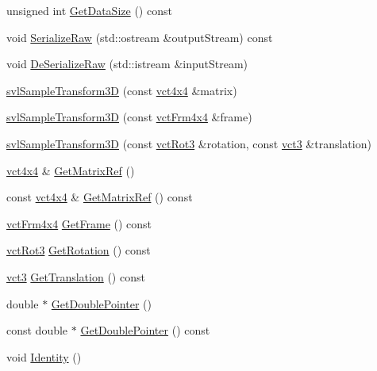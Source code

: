 \begin{DoxyCompactItemize}
\item 
unsigned int \hyperlink{classsvl_sample_transform3_d_aa7ba079194c5099ecc01fb9b8c0ba997}{Get\-Data\-Size} () const 
\item 
void \hyperlink{classsvl_sample_transform3_d_ad35557a72d1137681b37ba5b13686a9e}{Serialize\-Raw} (std\-::ostream \&output\-Stream) const 
\item 
void \hyperlink{classsvl_sample_transform3_d_a31daf08c5c80e9178b230f9f73678343}{De\-Serialize\-Raw} (std\-::istream \&input\-Stream)
\item 
\hyperlink{classsvl_sample_transform3_d_aeb4b9ed91b37d494bcd08fa9c7b37a89}{svl\-Sample\-Transform3\-D} (const \hyperlink{vct_fixed_size_matrix_types_8h_abd214ec98373cc3197c87dfd916c673f}{vct4x4} \&matrix)
\item 
\hyperlink{classsvl_sample_transform3_d_a6e82e35319a6cdb8c0cedeacd29237b9}{svl\-Sample\-Transform3\-D} (const \hyperlink{vct_transformation_types_8h_a33da47f4deb2556b37a69a2c44b29d75}{vct\-Frm4x4} \&frame)
\item 
\hyperlink{classsvl_sample_transform3_d_ae3e0b2b21ffd30f605ec9d70217095c0}{svl\-Sample\-Transform3\-D} (const \hyperlink{vct_transformation_types_8h_a248e13aafc9f88d238f1b29fa3f65536}{vct\-Rot3} \&rotation, const \hyperlink{vct_fixed_size_vector_types_8h_a3af82acdbf4eeb73c551909240b106ea}{vct3} \&translation)
\item 
\hyperlink{vct_fixed_size_matrix_types_8h_abd214ec98373cc3197c87dfd916c673f}{vct4x4} \& \hyperlink{classsvl_sample_transform3_d_aea14e44af059f6fc96bb44a684b13684}{Get\-Matrix\-Ref} ()
\item 
const \hyperlink{vct_fixed_size_matrix_types_8h_abd214ec98373cc3197c87dfd916c673f}{vct4x4} \& \hyperlink{classsvl_sample_transform3_d_a6babdbf4407804dba998e75de98823c5}{Get\-Matrix\-Ref} () const 
\item 
\hyperlink{vct_transformation_types_8h_a33da47f4deb2556b37a69a2c44b29d75}{vct\-Frm4x4} \hyperlink{classsvl_sample_transform3_d_af2af9f622fea8a79f791faedfc062d34}{Get\-Frame} () const 
\item 
\hyperlink{vct_transformation_types_8h_a248e13aafc9f88d238f1b29fa3f65536}{vct\-Rot3} \hyperlink{classsvl_sample_transform3_d_a4904886911b707fcb2b0bebadd04211a}{Get\-Rotation} () const 
\item 
\hyperlink{vct_fixed_size_vector_types_8h_a3af82acdbf4eeb73c551909240b106ea}{vct3} \hyperlink{classsvl_sample_transform3_d_a8e47b8f2dc964778e12d36cceee384ac}{Get\-Translation} () const 
\item 
double $\ast$ \hyperlink{classsvl_sample_transform3_d_a318d6fe40549c62f40b1adbc951e0fbc}{Get\-Double\-Pointer} ()
\item 
const double $\ast$ \hyperlink{classsvl_sample_transform3_d_a76a8db318da3a6170ddef297093a5428}{Get\-Double\-Pointer} () const 
\item 
void \hyperlink{classsvl_sample_transform3_d_a3c6f3674ab18f5d096facaa5513a71f7}{Identity} ()
\end{DoxyCompactItemize}

